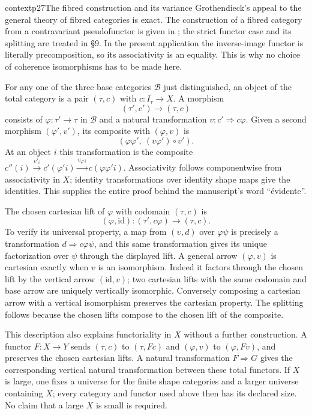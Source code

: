 \begin{dcomment}{context}{p27}{The fibred construction and its variance}
Grothendieck's appeal to the general theory of fibred categories is exact. The construction of a fibred category from a contravariant pseudofunctor is given in \citet[Expos\'e VI, \S8]{SGA1}; the strict functor case and its splitting are treated in \S9. In the present application the inverse-image functor is literally precomposition, so its associativity is an equality. This is why no choice of coherence isomorphisms has to be made here.

For any one of the three base categories $\mathcal B$ just distinguished, an object of the total category is a pair $(\tau,c)$ with $c:I_\tau\to X$. A morphism
\[
 (\tau',c')\longrightarrow(\tau,c)
\]
consists of $\varphi:\tau'\to\tau$ in $\mathcal B$ and a natural transformation $v:c'\Rightarrow c\varphi$. Given a second morphism $(\varphi',v')$, its composite with $(\varphi,v)$ is
\[
 (\varphi\varphi',\ (v\varphi')\circ v').
\]
At an object $i$ this transformation is the composite
$c''(i)\xrightarrow{v'_i}c'(\varphi'i)
 \xrightarrow{v_{\varphi'i}}c(\varphi\varphi'i)$.
Associativity follows componentwise from associativity in $X$; identity transformations over identity shape maps give the identities. This supplies the entire proof behind the manuscript's word ``\'evidente''.

The chosen cartesian lift of $\varphi$ with codomain $(\tau,c)$ is
\[
 (\varphi,\mathrm{id}):(\tau',c\varphi)\longrightarrow(\tau,c).
\]
To verify its universal property, a map from $(\upsilon,d)$ over $\varphi\psi$ is precisely a transformation $d\Rightarrow c\varphi\psi$, and this same transformation gives its unique factorization over $\psi$ through the displayed lift. A general arrow $(\varphi,v)$ is cartesian exactly when $v$ is an isomorphism. Indeed it factors through the chosen lift by the vertical arrow $(\mathrm{id},v)$; two cartesian lifts with the same codomain and base arrow are uniquely vertically isomorphic. Conversely composing a cartesian arrow with a vertical isomorphism preserves the cartesian property. The splitting follows because the chosen lifts compose to the chosen lift of the composite.

This description also explains functoriality in $X$ without a further construction. A functor $F:X\to Y$ sends $(\tau,c)$ to $(\tau,Fc)$ and $(\varphi,v)$ to $(\varphi,Fv)$, and preserves the chosen cartesian lifts. A natural transformation $F\Rightarrow G$ gives the corresponding vertical natural transformation between these total functors. If $X$ is large, one fixes a universe for the finite shape categories and a larger universe containing $X$; every category and functor used above then has its declared size. No claim that a large $X$ is small is required.
\end{dcomment}

